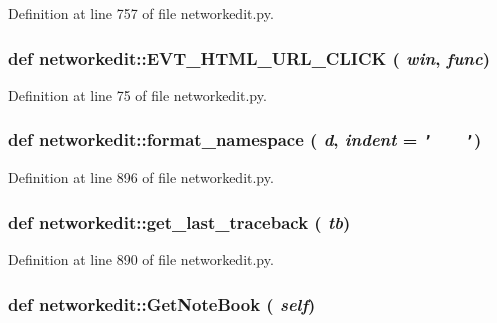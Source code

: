 Definition at line 757 of file networkedit.py.\hypertarget{namespacenetworkedit_f4d85792fc654e45170911a58483376e}{
\subsubsection[EVT\_\-HTML\_\-URL\_\-CLICK]{\setlength{\rightskip}{0pt plus 5cm}def networkedit::EVT\_\-HTML\_\-URL\_\-CLICK ( {\em win},  {\em func})}}
\label{namespacenetworkedit_f4d85792fc654e45170911a58483376e}




Definition at line 75 of file networkedit.py.\hypertarget{namespacenetworkedit_9e8150613da488877091ed43d4892554}{
\subsubsection[format\_\-namespace]{\setlength{\rightskip}{0pt plus 5cm}def networkedit::format\_\-namespace ( {\em d},  {\em indent} = {\tt '~~~~'})}}
\label{namespacenetworkedit_9e8150613da488877091ed43d4892554}




Definition at line 896 of file networkedit.py.\hypertarget{namespacenetworkedit_94d508d0c774a0e391694ebcaa664b96}{
\subsubsection[get\_\-last\_\-traceback]{\setlength{\rightskip}{0pt plus 5cm}def networkedit::get\_\-last\_\-traceback ( {\em tb})}}
\label{namespacenetworkedit_94d508d0c774a0e391694ebcaa664b96}




Definition at line 890 of file networkedit.py.\hypertarget{namespacenetworkedit_49f12cd3b720322e147f77841999dbd3}{
\subsubsection[GetNoteBook]{\setlength{\rightskip}{0pt plus 5cm}def networkedit::Get\-Note\-Book ( {\em self})}}
\label{namespacenetworkedit_49f12cd3b720322e147f77841999dbd3}




